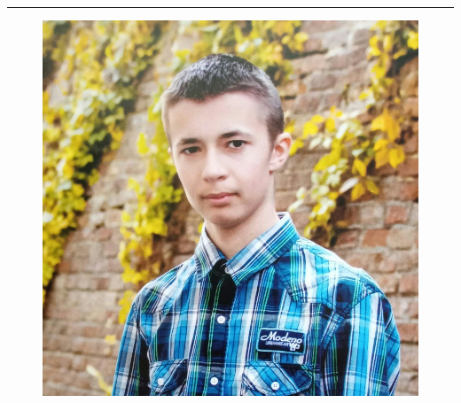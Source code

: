 
\par\noindent\rule{\textwidth}{0.1mm}

\begin{figure}
    \begin{flushright}
        \includegraphics[width=0.2\linewidth]{images/profile.jpeg}
    \end{flushright}
\end{figure}
